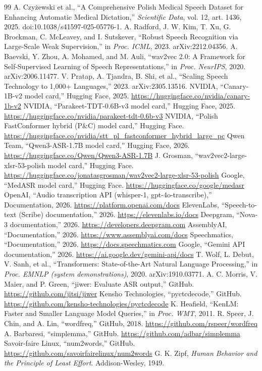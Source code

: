 \documentclass[conference]{IEEEtran}
\begin{document}
\begin{thebibliography}{99}
 A. Czyżewski et al., ``A Comprehensive Polish Medical Speech Dataset for Enhancing Automatic Medical Dictation,'' \emph{Scientific Data}, vol. 12, art. 1436, 2025. doi:10.1038/s41597-025-05776-1.
 A. Radford, J. W. Kim, T. Xu, G. Brockman, C. McLeavey, and I. Sutskever, ``Robust Speech Recognition via Large-Scale Weak Supervision,'' in \emph{Proc. ICML}, 2023. arXiv:2212.04356.
 A. Baevski, Y. Zhou, A. Mohamed, and M. Auli, ``wav2vec 2.0: A Framework for Self-Supervised Learning of Speech Representations,'' in \emph{Proc. NeurIPS}, 2020. arXiv:2006.11477.
 V. Pratap, A. Tjandra, B. Shi, et al., ``Scaling Speech Technology to 1,000+ Languages,'' 2023. arXiv:2305.13516.
 NVIDIA, ``Canary-1B-v2 model card,'' Hugging Face, 2025. \url{https://huggingface.co/nvidia/canary-1b-v2}
 NVIDIA, ``Parakeet-TDT-0.6B-v3 model card,'' Hugging Face, 2025. \url{https://huggingface.co/nvidia/parakeet-tdt-0.6b-v3}
 NVIDIA, ``Polish FastConformer hybrid (P\&C) model card,'' Hugging Face. \url{https://huggingface.co/nvidia/stt_pl_fastconformer_hybrid_large_pc}
 Qwen Team, ``Qwen3-ASR-1.7B model card,'' Hugging Face, 2026. \url{https://huggingface.co/Qwen/Qwen3-ASR-1.7B}
 J. Grosman, ``wav2vec2-large-xlsr-53-polish model card,'' Hugging Face. \url{https://huggingface.co/jonatasgrosman/wav2vec2-large-xlsr-53-polish}
 Google, ``MedASR model card,'' Hugging Face. \url{https://huggingface.co/google/medasr}
 OpenAI, ``Audio transcription API (whisper-1, gpt-4o-transcribe),'' Documentation, 2026. \url{https://platform.openai.com/docs}
 ElevenLabs, ``Speech-to-text (Scribe) documentation,'' 2026. \url{https://elevenlabs.io/docs}
 Deepgram, ``Nova-3 documentation,'' 2026. \url{https://developers.deepgram.com}
 AssemblyAI, ``Documentation,'' 2026. \url{https://www.assemblyai.com/docs}
 Speechmatics, ``Documentation,'' 2026. \url{https://docs.speechmatics.com}
 Google, ``Gemini API documentation,'' 2026. \url{https://ai.google.dev/gemini-api/docs}
 T. Wolf, L. Debut, V. Sanh, et al., ``Transformers: State-of-the-Art Natural Language Processing,'' in \emph{Proc. EMNLP (system demonstrations)}, 2020. arXiv:1910.03771.
 A. C. Morris, V. Maier, and P. Green, ``jiwer: Evaluate ASR output,'' GitHub. \url{https://github.com/jitsi/jiwer}
 Kensho Technologies, ``pyctcdecode,'' GitHub. \url{https://github.com/kensho-technologies/pyctcdecode}
 K. Heafield, ``KenLM: Faster and Smaller Language Model Queries,'' in \emph{Proc. WMT}, 2011.
 R. Speer, J. Chin, and A. Lin, ``wordfreq,'' GitHub, 2018. \url{https://github.com/rspeer/wordfreq}
 A. Barbaresi, ``simplemma,'' GitHub. \url{https://github.com/adbar/simplemma}
 Savoir-faire Linux, ``num2words,'' GitHub. \url{https://github.com/savoirfairelinux/num2words}
 G. K. Zipf, \emph{Human Behavior and the Principle of Least Effort}. Addison-Wesley, 1949.
\end{thebibliography}
\end{document}

